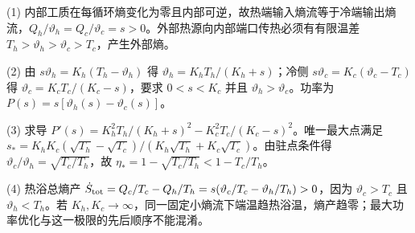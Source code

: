 (1) 内部工质在每循环熵变化为零且内部可逆，故热端输入熵流等于冷端输出熵流，\(Q_h/\vartheta_h=Q_c/\vartheta_c=s>0\)。外部热源向内部端口传热必须有有限温差 \(T_h>\vartheta_h>\vartheta_c>T_c\)，产生外部熵。

(2) 由 \(s\vartheta_h=K_h(T_h-\vartheta_h)\) 得 \(\vartheta_h=K_hT_h/(K_h+s)\)；冷侧 \(s\vartheta_c=K_c(\vartheta_c-T_c)\) 得 \(\vartheta_c=K_cT_c/(K_c-s)\)，要求 \(0<s<K_c\) 并且 \(\vartheta_h>\vartheta_c\)。功率为 \(P(s)=s[\vartheta_h(s)-\vartheta_c(s)]\)。

(3) 求导 \(P'(s)=K_h^2T_h/(K_h+s)^2-K_c^2T_c/(K_c-s)^2\)。唯一最大点满足 \(\boxed{s_*=K_hK_c(\sqrt{T_h}-\sqrt{T_c})/(K_h\sqrt{T_h}+K_c\sqrt{T_c})}\)。由驻点条件得 \(\vartheta_c/\vartheta_h=\sqrt{T_c/T_h}\)，故 \(\boxed{\eta_*=1-\sqrt{T_c/T_h}<1-T_c/T_h}\)。

(4) 热浴总熵产 \(\dot S_{\rm tot}=Q_c/T_c-Q_h/T_h=s(\vartheta_c/T_c-\vartheta_h/T_h)>0\)，因为 \(\vartheta_c>T_c\) 且 \(\vartheta_h<T_h\)。若 \(K_h,K_c\to\infty\)，同一固定小熵流下端温趋热浴温，熵产趋零；最大功率优化与这一极限的先后顺序不能混淆。
